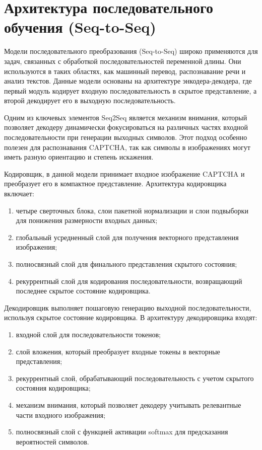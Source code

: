 \documentclass{altsu-report}
\begin{document}
\section*{Архитектура последовательного обучения (Seq-to-Seq)}

Модели последовательного преобразования (Seq-to-Seq) широко применяются для задач, связанных с обработкой последовательностей переменной длины. Они используются в таких областях, как машинный перевод, распознавание речи и анализ текстов. Данные модели основаны на архитектуре энкодера-декодера, где первый модуль кодирует входную последовательность в скрытое представление, а второй декодирует его в выходную последовательность.

Одним из ключевых элементов Seq2Seq является механизм внимания, который позволяет декодеру динамически фокусироваться на различных частях входной последовательности при генерации выходных символов. Этот подход особенно полезен для распознавания CAPTCHA, так как символы в изображениях могут иметь разную ориентацию и степень искажения.

Кодировщик, в данной модели принимает входное изображение CAPTCHA и преобразует его в компактное представление. Архитектура кодировщика включает:
\begin{enumerate}
    \item четыре сверточных блока, слои пакетной нормализации и слои подвыборки для понижения размерности входных данных;
    \item глобальный усредненный слой для получения векторного представления изображения;
    \item полносвязный слой для финального представления скрытого состояния;
    \item рекуррентный слой для кодирования последовательности, возвращающий последнее скрытое состояние кодировщика.
\end{enumerate}

Декодировщик выполняет пошаговую генерацию выходной последовательности, используя скрытое состояние кодировщика. В архитектуру декодировщика входят:
\begin{enumerate}
    \item входной слой для последовательности токенов;
    \item слой вложения, который преобразует входные токены в векторные представления;
    \item рекуррентный слой, обрабатывающий последовательность с учетом скрытого состояния кодировщика;
    \item механизм внимания, который позволяет декодеру учитывать релевантные части входного изображения;
    \item полносвязный слой с функцией активации softmax для предсказания вероятностей символов.
\end{enumerate}
\end{document}
